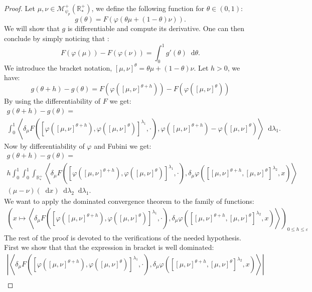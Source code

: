 \documentclass[11pt,a4paper]{article}
\newcommand{\RRP}{\mathbb{R}^+_*}
\newcommand{\MC}{\mathcal{M}}
\newcommand{\brac}[1]{\left\langle#1\right\rangle}
\newcommand{\dd}{\mathop{}\!\mathrm{d}}
\begin{document}
\begin{proof}
    Let $\mu,\nu \in \MC^+_{\psi_p}(\RRP)$, we define the following function for $\theta \in (0,1)$:
    \[
        g(\theta) =  F\left(\varphi(\theta\mu + (1 - \theta)\nu)\right).
    \]
    We will show that $g$ is differentiable and compute its derivative. One can then conclude by simply noticing that :
    \[ F(\varphi(\mu)) - F(\varphi(\nu)) = \int_0^1 g'(\theta) \dd \theta.\]
    We introduce the bracket notation, $[\mu,\nu]^{\theta } =  \theta\mu + (1 - \theta)\nu$. Let $h > 0$, we have:
    \[ 
    g(\theta + h) - g(\theta) = F\left(\varphi\left([\mu,\nu]^{\theta + h}\right)\right) -F\left(\varphi\left([\mu,\nu]^{\theta}\right)\right)
    \]
    By using the differentiability of $F$ we get:
    \begin{multline*}
    g(\theta + h) - g(\theta) =\\ \int_0^1 \brac{\delta_\mu F\left(\left[\varphi\left([\mu,\nu]^{\theta + h}\right),\varphi\left([\mu,\nu]^{\theta}\right)\right]^{\lambda_1}, \cdot \right),\varphi\left([\mu,\nu]^{\theta + h}\right) - \varphi\left([\mu,\nu]^{\theta}\right)} \dd \lambda_1.
    \end{multline*}
    Now by differentiability of $\varphi$ and Fubini we get:
    \begin{multline*}
        g(\theta + h) - g(\theta) =\\
        h\int_0^1 \int_0^1\int_{\RRP} \brac{\delta_\mu F\left(\left[\varphi\left([\mu,\nu]^{\theta + h}\right),\varphi\left([\mu,\nu]^{\theta}\right)\right]^{\lambda_1}, \cdot \right),\delta_\mu \varphi\left(\left[ [\mu,\nu]^{\theta + h}, [\mu,\nu]^{\theta }\right]^{\lambda_2} ,x\right)}
        \\
        (\mu-\nu)(\dd x) \dd \lambda_2 \dd \lambda_1. 
    \end{multline*}
    We want to apply the dominated convergence theorem to the family of functions:
    \begin{align*}
        \left(x \mapsto \brac{\delta_\mu F\left(\left[\varphi\left([\mu,\nu]^{\theta + h}\right),\varphi\left([\mu,\nu]^{\theta}\right)\right]^{\lambda_1}, \cdot \right),\delta_\mu \varphi\left(\left[ [\mu,\nu]^{\theta + h}, [\mu,\nu]^{\theta }\right]^{\lambda_2} ,x\right)} \right)_{0 \leq h \leq \varepsilon}
    \end{align*}
    The rest of the proof is devoted to the verifications of the needed hypothesis. First we show that that the expression in bracket is well dominated:
    \begin{multline*}
        \left| \brac{\delta_\mu F\left(\left[\varphi\left([\mu,\nu]^{\theta + h}\right),\varphi\left([\mu,\nu]^{\theta}\right)\right]^{\lambda_1}, \cdot \right),\delta_\mu \varphi\left(\left[ [\mu,\nu]^{\theta + h}, [\mu,\nu]^{\theta }\right]^{\lambda_2} ,x\right)} \right| \\

\end{multline*}
\end{proof}
\end{document}
